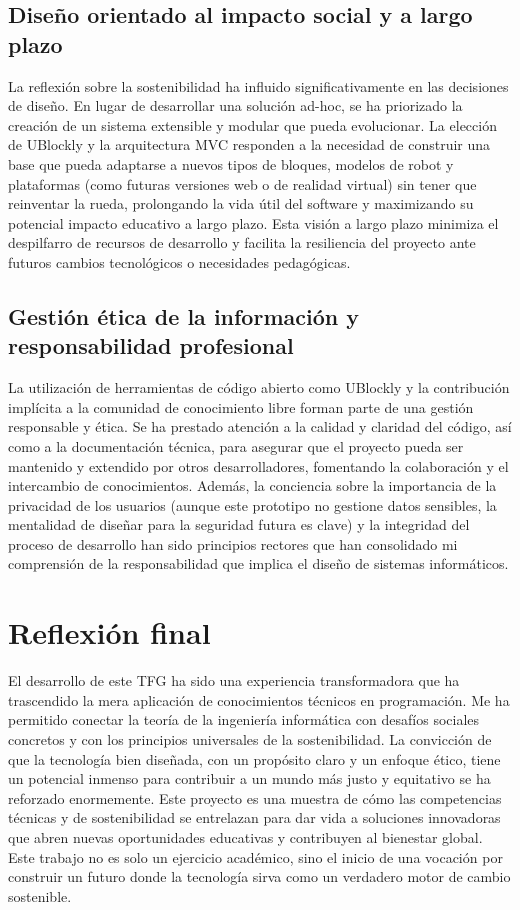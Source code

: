 \subsection{Diseño orientado al impacto social y a largo plazo}
La reflexión sobre la sostenibilidad ha influido significativamente en las decisiones de diseño. En lugar de desarrollar una solución ad-hoc, se ha priorizado la creación de un sistema extensible y modular que pueda evolucionar. La elección de UBlockly y la arquitectura MVC responden a la necesidad de construir una base que pueda adaptarse a nuevos tipos de bloques, modelos de robot y plataformas (como futuras versiones web o de realidad virtual) sin tener que reinventar la rueda, prolongando la vida útil del software y maximizando su potencial impacto educativo a largo plazo. Esta visión a largo plazo minimiza el despilfarro de recursos de desarrollo y facilita la resiliencia del proyecto ante futuros cambios tecnológicos o necesidades pedagógicas.
\subsection{Gestión ética de la información y responsabilidad profesional}
La utilización de herramientas de código abierto como UBlockly y la contribución implícita a la comunidad de conocimiento libre forman parte de una gestión responsable y ética. Se ha prestado atención a la calidad y claridad del código, así como a la documentación técnica, para asegurar que el proyecto pueda ser mantenido y extendido por otros desarrolladores, fomentando la colaboración y el intercambio de conocimientos. Además, la conciencia sobre la importancia de la privacidad de los usuarios (aunque este prototipo no gestione datos sensibles, la mentalidad de diseñar para la seguridad futura es clave) y la integridad del proceso de desarrollo han sido principios rectores que han consolidado mi comprensión de la responsabilidad que implica el diseño de sistemas informáticos.
\section{Reflexión final}
El desarrollo de este TFG ha sido una experiencia transformadora que ha trascendido la mera aplicación de conocimientos técnicos en programación. Me ha permitido conectar la teoría de la ingeniería informática con desafíos sociales concretos y con los principios universales de la sostenibilidad. La convicción de que la tecnología bien diseñada, con un propósito claro y un enfoque ético, tiene un potencial inmenso para contribuir a un mundo más justo y equitativo se ha reforzado enormemente. Este proyecto es una muestra de cómo las competencias técnicas y de sostenibilidad se entrelazan para dar vida a soluciones innovadoras que abren nuevas oportunidades educativas y contribuyen al bienestar global. Este trabajo no es solo un ejercicio académico, sino el inicio de una vocación por construir un futuro donde la tecnología sirva como un verdadero motor de cambio sostenible.
